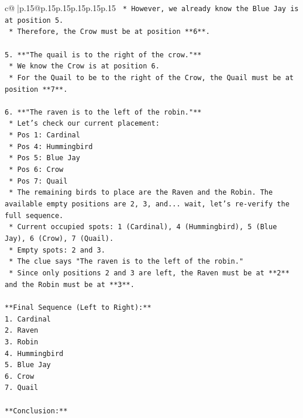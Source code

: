 \documentclass{article}
\begin{document}
{\begin{supertabular}{c@{$\;$}|p{.15\linewidth}@{}p{.15\linewidth}p{.15\linewidth}p{.15\linewidth}p{.15\linewidth}p{.15\linewidth}}
{{{\texttt{    *   However, we already know the Blue Jay is at position 5.} \\
\texttt{    *   Therefore, the Crow must be at position **6**.} \\
\\ 
\texttt{5.  **"The quail is to the right of the crow."**} \\
\texttt{    *   We know the Crow is at position 6.} \\
\texttt{    *   For the Quail to be to the right of the Crow, the Quail must be at position **7**.} \\
\\ 
\texttt{6.  **"The raven is to the left of the robin."**} \\
\texttt{    *   Let's check our current placement:} \\
\texttt{        *   Pos 1: Cardinal} \\
\texttt{        *   Pos 4: Hummingbird} \\
\texttt{        *   Pos 5: Blue Jay} \\
\texttt{        *   Pos 6: Crow} \\
\texttt{        *   Pos 7: Quail} \\
\texttt{    *   The remaining birds to place are the Raven and the Robin. The available empty positions are 2, 3, and... wait, let's re{-}verify the full sequence.} \\
\texttt{    *   Current occupied spots: 1 (Cardinal), 4 (Hummingbird), 5 (Blue Jay), 6 (Crow), 7 (Quail).} \\
\texttt{    *   Empty spots: 2 and 3.} \\
\texttt{    *   The clue says "The raven is to the left of the robin."} \\
\texttt{    *   Since only positions 2 and 3 are left, the Raven must be at **2** and the Robin must be at **3**.} \\
\\ 
\texttt{**Final Sequence (Left to Right):**} \\
\texttt{1.  Cardinal} \\
\texttt{2.  Raven} \\
\texttt{3.  Robin} \\
\texttt{4.  Hummingbird} \\
\texttt{5.  Blue Jay} \\
\texttt{6.  Crow} \\
\texttt{7.  Quail} \\
\\ 
\texttt{**Conclusion:**} \\
}}}
\end{supertabular}}
\end{document}
